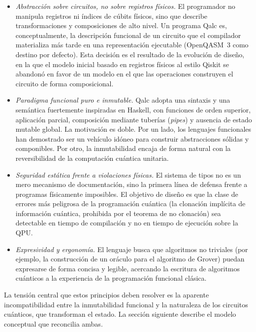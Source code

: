 \begin{itemize}
  \item \textit{Abstracción sobre circuitos, no sobre registros físicos.} El programador no manipula registros ni índices de cúbits físicos, sino que describe transformaciones y composiciones de alto nivel. Un programa Qalc es, conceptualmente, la descripción funcional de un circuito que el compilador materializa más tarde en una representación ejecutable (OpenQASM~3 como destino por defecto). Esta decisión es el resultado de la evolución de diseño, en la que el modelo inicial basado en registros físicos al estilo Qiskit se abandonó en favor de un modelo en el que las operaciones construyen el circuito de forma composicional.

  \item \textit{Paradigma funcional puro e inmutable.} Qalc adopta una sintaxis y una semántica fuertemente inspiradas en Haskell, con funciones de orden superior, aplicación parcial, composición mediante tuberías (\textit{pipes}) y ausencia de estado mutable global. La motivación es doble. Por un lado, los lenguajes funcionales han demostrado ser un vehículo idóneo para construir abstracciones sólidas y componibles. Por otro, la inmutabilidad encaja de forma natural con la reversibilidad de la computación cuántica unitaria.

  \item \textit{Seguridad estática frente a violaciones físicas.} El sistema de tipos no es un mero mecanismo de documentación, sino la primera línea de defensa frente a programas físicamente imposibles. El objetivo de diseño es que la clase de errores más peligrosa de la programación cuántica (la clonación implícita de información cuántica, prohibida por el teorema de no clonación) sea detectable en tiempo de compilación y no en tiempo de ejecución sobre la QPU.

  \item \textit{Expresividad y ergonomía.} El lenguaje busca que algoritmos no triviales (por ejemplo, la construcción de un oráculo para el algoritmo de Grover) puedan expresarse de forma concisa y legible, acercando la escritura de algoritmos cuánticos a la experiencia de la programación funcional clásica.
\end{itemize}

La tensión central que estos principios deben resolver es la aparente incompatibilidad entre la inmutabilidad funcional y la naturaleza de los circuitos cuánticos, que transforman el estado. La sección siguiente describe el modelo conceptual que reconcilia ambas.

